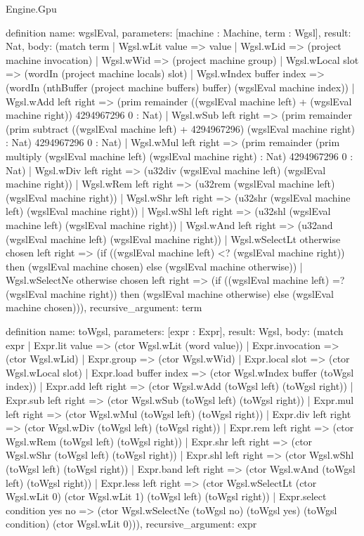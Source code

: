 \begin{lexlean}{Engine.Gpu}
\begin{semanticmodule}
definition{
  name: wgslEval,
  parameters: [machine : Machine, term : Wgsl],
  result: Nat,
  body: (match term
    | Wgsl.wLit value => value
    | Wgsl.wLid => (project machine invocation)
    | Wgsl.wWid => (project machine group)
    | Wgsl.wLocal slot => (wordIn (project machine locals) slot)
    | Wgsl.wIndex buffer index => (wordIn (nthBuffer (project machine buffers) buffer) (wgslEval machine index))
    | Wgsl.wAdd left right => (prim remainder ((wgslEval machine left) + (wgslEval machine right)) 4294967296 0 : Nat)
    | Wgsl.wSub left right => (prim remainder (prim subtract ((wgslEval machine left) + 4294967296) (wgslEval machine right) : Nat) 4294967296 0 : Nat)
    | Wgsl.wMul left right => (prim remainder (prim multiply (wgslEval machine left) (wgslEval machine right) : Nat) 4294967296 0 : Nat)
    | Wgsl.wDiv left right => (u32div (wgslEval machine left) (wgslEval machine right))
    | Wgsl.wRem left right => (u32rem (wgslEval machine left) (wgslEval machine right))
    | Wgsl.wShr left right => (u32shr (wgslEval machine left) (wgslEval machine right))
    | Wgsl.wShl left right => (u32shl (wgslEval machine left) (wgslEval machine right))
    | Wgsl.wAnd left right => (u32and (wgslEval machine left) (wgslEval machine right))
    | Wgsl.wSelectLt otherwise chosen left right => (if ((wgslEval machine left) <? (wgslEval machine right)) then (wgslEval machine chosen) else (wgslEval machine otherwise))
    | Wgsl.wSelectNe otherwise chosen left right => (if ((wgslEval machine left) =? (wgslEval machine right)) then (wgslEval machine otherwise) else (wgslEval machine chosen))),
  recursive_argument: term
}

definition{
  name: toWgsl,
  parameters: [expr : Expr],
  result: Wgsl,
  body: (match expr
    | Expr.lit value => (ctor Wgsl.wLit (word value))
    | Expr.invocation => (ctor Wgsl.wLid)
    | Expr.group => (ctor Wgsl.wWid)
    | Expr.local slot => (ctor Wgsl.wLocal slot)
    | Expr.load buffer index => (ctor Wgsl.wIndex buffer (toWgsl index))
    | Expr.add left right => (ctor Wgsl.wAdd (toWgsl left) (toWgsl right))
    | Expr.sub left right => (ctor Wgsl.wSub (toWgsl left) (toWgsl right))
    | Expr.mul left right => (ctor Wgsl.wMul (toWgsl left) (toWgsl right))
    | Expr.div left right => (ctor Wgsl.wDiv (toWgsl left) (toWgsl right))
    | Expr.rem left right => (ctor Wgsl.wRem (toWgsl left) (toWgsl right))
    | Expr.shr left right => (ctor Wgsl.wShr (toWgsl left) (toWgsl right))
    | Expr.shl left right => (ctor Wgsl.wShl (toWgsl left) (toWgsl right))
    | Expr.band left right => (ctor Wgsl.wAnd (toWgsl left) (toWgsl right))
    | Expr.less left right => (ctor Wgsl.wSelectLt (ctor Wgsl.wLit 0) (ctor Wgsl.wLit 1) (toWgsl left) (toWgsl right))
    | Expr.select condition yes no => (ctor Wgsl.wSelectNe (toWgsl no) (toWgsl yes) (toWgsl condition) (ctor Wgsl.wLit 0))),
  recursive_argument: expr
}


\end{semanticmodule}
\end{lexlean}
